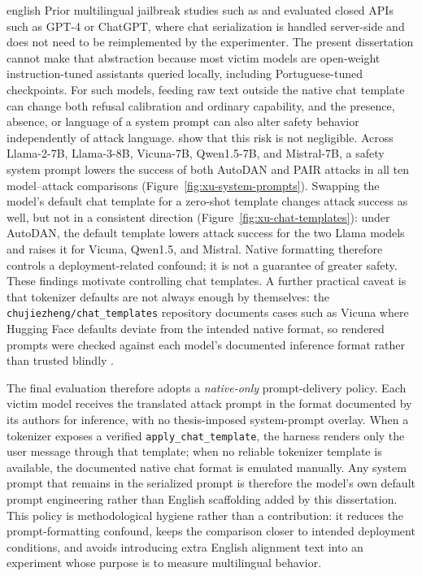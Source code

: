 \begin{otherlanguage*}{english}
Prior multilingual jailbreak studies such as \textcite{yongLowResourceLanguagesJailbreak2023} and \textcite{dengMultilingualJailbreakChallenges2024} evaluated closed APIs such as GPT-4 or ChatGPT, where chat serialization is handled server-side and does not need to be reimplemented by the experimenter. The present dissertation cannot make that abstraction because most victim models are open-weight instruction-tuned assistants queried locally, including Portuguese-tuned checkpoints. For such models, feeding raw text outside the native chat template can change both refusal calibration and ordinary capability, and the presence, absence, or language of a system prompt can also alter safety behavior independently of attack language. \textcite{xuBagTricksBenchmarking2024} show that this risk is not negligible. Across Llama-2-7B, Llama-3-8B, Vicuna-7B, Qwen1.5-7B, and Mistral-7B, a safety system prompt lowers the success of both AutoDAN and PAIR attacks in all ten model--attack comparisons (Figure~\ref{fig:xu-system-prompts}). Swapping the model's default chat template for a zero-shot template changes attack success as well, but not in a consistent direction (Figure~\ref{fig:xu-chat-templates}): under AutoDAN, the default template lowers attack success for the two Llama models and raises it for Vicuna, Qwen1.5, and Mistral. Native formatting therefore controls a deployment-related confound; it is not a guarantee of greater safety. These findings motivate controlling chat templates. A further practical caveat is that tokenizer defaults are not always enough by themselves: the \texttt{chujiezheng/chat\_templates} repository documents cases such as Vicuna where Hugging Face defaults deviate from the intended native format, so rendered prompts were checked against each model's documented inference format rather than trusted blindly \cite{zhengChatTemplates2024}.

The final evaluation therefore adopts a \emph{native-only} prompt-delivery policy. Each victim model receives the translated attack prompt in the format documented by its authors for inference, with no thesis-imposed system-prompt overlay. When a tokenizer exposes a verified \texttt{apply\_chat\_template}, the harness renders only the user message through that template; when no reliable tokenizer template is available, the documented native chat format is emulated manually. Any system prompt that remains in the serialized prompt is therefore the model's own default prompt engineering rather than English scaffolding added by this dissertation. This policy is methodological hygiene rather than a contribution: it reduces the prompt-formatting confound, keeps the comparison closer to intended deployment conditions, and avoids introducing extra English alignment text into an experiment whose purpose is to measure multilingual behavior.


\end{otherlanguage*}
